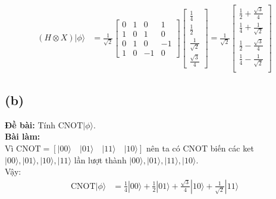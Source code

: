 \begin{align*}
    (H\otimes X)|\phi\rangle & = \frac{1}{\sqrt{2}}\begin{bmatrix}
                                                       0 & 1 & 0  & 1  \\
                                                       1 & 0 & 1  & 0  \\
                                                       0 & 1 & 0  & -1 \\
                                                       1 & 0 & -1 & 0
                                                   \end{bmatrix} \begin{bmatrix}
                                                                     \frac{1}{4}        \\
                                                                     \frac{1}{2}        \\
                                                                     \frac{1}{\sqrt{2}} \\
                                                                     \frac{\sqrt{3}}{4}
                                                                 \end{bmatrix} = \frac{1}{\sqrt{2}} \begin{bmatrix}
                                                                                                        \frac{1}{2} + \frac{\sqrt{3}}{4} \\
                                                                                                        \frac{1}{4} + \frac{1}{\sqrt{2}} \\
                                                                                                        \frac{1}{2} - \frac{\sqrt{3}}{4} \\
                                                                                                        \frac{1}{4} - \frac{1}{\sqrt{2}} \\
                                                                                                    \end{bmatrix}
\end{align*}


\subsection{(b)}
\textbf{Đề bài:} Tính $\mathrm{CNOT}|\phi\rangle$.\\
\textbf{Bài làm:}\\
Vì $\mathrm{CNOT} = [|00\rangle \quad |01\rangle \quad |11\rangle \quad |10\rangle]$ nên ta có $\mathrm{CNOT}$ biến các ket $|00\rangle, |01\rangle, |10\rangle, |11\rangle$ lần lượt thành $|00\rangle, |01\rangle, |11\rangle, |10\rangle$.\\
Vậy:
\begin{align*}
    \mathrm{CNOT}|\phi\rangle & = \frac{1}{4}|00\rangle+\frac{1}{2}|01\rangle+\frac{\sqrt{3}}{4}|10\rangle+\frac{1}{\sqrt{2}}|11\rangle
\end{align*}